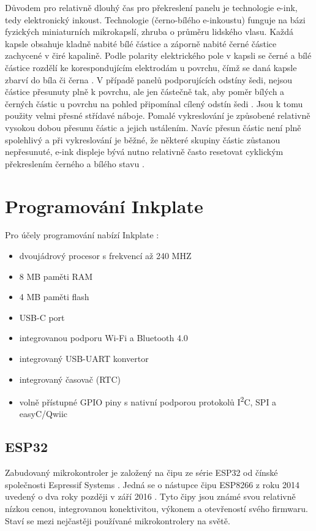 Důvodem pro relativně dlouhý čas pro překreslení panelu je technologie e-ink, tedy elektronický inkoust. Technologie (černo-bílého e-inkoustu) funguje na bázi fyzických miniaturních mikrokapslí, zhruba o průměru lidského vlasu. Každá kapsle obsahuje kladně nabité bílé částice a záporně nabité černé částice zachycené v čiré kapalině. Podle polarity elektrického pole v kapsli se černé a bílé částice rozdělí ke korespondujícím elektrodám u povrchu, čímž se daná kapsle zbarví do bíla či černa \cite{einkholdingsinc.ElectronicInkInk}. V případě panelů podporujících odstíny šedi, nejsou částice přesunuty plně k povrchu, ale jen částečně tak, aby poměr bílých a černých částic u povrchu na pohled připomínal cílený odstín šedi \cite{adafruitindustriesTHINKINKHow2020}. Jsou k tomu použity velmi přesné střídavé náboje. Pomalé vykreslování je způsobené relativně vysokou dobou přesunu částic a jejich ustálením. Navíc přesun částic není plně spolehlivý a při vykreslování je běžné, že některé skupiny částic zůstanou nepřesunuté, e-ink displeje bývá nutno relativně často resetovat cyklickým překreslením černého a bílého stavu \cite{heikenfeldReviewPaperCritical2011}.

\section{Programování Inkplate}

Pro účely programování nabízí Inkplate \cite{solderedelectronicsInkplate102021}\cite{solderedelectronicsInkplateFeaturesInkplate}:
\begin{itemize}
    \item dvoujádrový procesor s frekvencí až 240 MHZ
    \item 8 MB paměti RAM
    \item 4 MB paměti flash
    \item USB-C port
    \item integrovanou podporu Wi-Fi a Bluetooth 4.0
    \item integrovaný USB-UART konvertor
    \item integrovaný časovač (RTC)
    \item volně přístupné GPIO piny s nativní podporou protokolů I\textsuperscript{2}C, SPI a easyC/Qwiic
\end{itemize}

\subsection{ESP32}
Zabudovaný mikrokontroler je založený na čipu ze série ESP32 od čínské společnosti Espressif Systems \cite{espressifEspressifEspressifSystems}. Jedná se o nástupce čipu ESP8266 z roku 2014 uvedený o dva roky později v září 2016 \cite{espressifEspressifAnnouncesLaunch}. Tyto čipy jsou známé svou relativně nízkou cenou, integrovanou konektivitou, výkonem a otevřeností svého firmwaru. Staví se mezi nejčastěji používané mikrokontrolery na světě\cite{espressifEspressifLeadsIoT}\cite{espressifEspressifEspressifSystems}.

